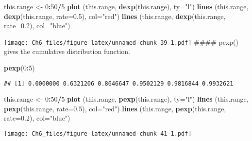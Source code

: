 \documentclass[
]{article}
\newenvironment{Shaded}{\begin{snugshade}}{\end{snugshade}}
\newcommand{\AttributeTok}[1]{\textcolor[rgb]{0.13,0.29,0.53}{#1}}
\newcommand{\DecValTok}[1]{\textcolor[rgb]{0.00,0.00,0.81}{#1}}
\newcommand{\FloatTok}[1]{\textcolor[rgb]{0.00,0.00,0.81}{#1}}
\newcommand{\FunctionTok}[1]{\textcolor[rgb]{0.13,0.29,0.53}{\textbf{#1}}}
\newcommand{\NormalTok}[1]{#1}
\newcommand{\OtherTok}[1]{\textcolor[rgb]{0.56,0.35,0.01}{#1}}
\newcommand{\SpecialCharTok}[1]{\textcolor[rgb]{0.81,0.36,0.00}{\textbf{#1}}}
\newcommand{\StringTok}[1]{\textcolor[rgb]{0.31,0.60,0.02}{#1}}
\begin{document}
\begin{Shaded}
\begin{Highlighting}[]
\NormalTok{this.range }\OtherTok{\textless{}{-}} \DecValTok{0}\SpecialCharTok{:}\DecValTok{50}\SpecialCharTok{/}\DecValTok{5}
\FunctionTok{plot}\NormalTok{ (this.range, }\FunctionTok{dexp}\NormalTok{(this.range), }\AttributeTok{ty=}\StringTok{"l"}\NormalTok{)}
\FunctionTok{lines}\NormalTok{ (this.range, }\FunctionTok{dexp}\NormalTok{(this.range, }\AttributeTok{rate=}\FloatTok{0.5}\NormalTok{), }\AttributeTok{col=}\StringTok{"red"}\NormalTok{)}
\FunctionTok{lines}\NormalTok{ (this.range, }\FunctionTok{dexp}\NormalTok{(this.range, }\AttributeTok{rate=}\FloatTok{0.2}\NormalTok{), }\AttributeTok{col=}\StringTok{"blue"}\NormalTok{)}
\end{Highlighting}
\end{Shaded}

\texttt{[image: Ch6\_files/figure-latex/unnamed-chunk-39-1.pdf]} \#\#\#\#
pexp() gives the cumulative distribution function.

\begin{Shaded}
\begin{Highlighting}[]
\FunctionTok{pexp}\NormalTok{(}\DecValTok{0}\SpecialCharTok{:}\DecValTok{5}\NormalTok{)}
\end{Highlighting}
\end{Shaded}

\begin{verbatim}
## [1] 0.0000000 0.6321206 0.8646647 0.9502129 0.9816844 0.9932621
\end{verbatim}

\begin{Shaded}
\begin{Highlighting}[]
\NormalTok{this.range }\OtherTok{\textless{}{-}} \DecValTok{0}\SpecialCharTok{:}\DecValTok{50}\SpecialCharTok{/}\DecValTok{5}
\FunctionTok{plot}\NormalTok{ (this.range, }\FunctionTok{pexp}\NormalTok{(this.range), }\AttributeTok{ty=}\StringTok{"l"}\NormalTok{)}
\FunctionTok{lines}\NormalTok{ (this.range, }\FunctionTok{pexp}\NormalTok{(this.range, }\AttributeTok{rate=}\FloatTok{0.5}\NormalTok{), }\AttributeTok{col=}\StringTok{"red"}\NormalTok{)}
\FunctionTok{lines}\NormalTok{ (this.range, }\FunctionTok{pexp}\NormalTok{(this.range, }\AttributeTok{rate=}\FloatTok{0.2}\NormalTok{), }\AttributeTok{col=}\StringTok{"blue"}\NormalTok{)}
\end{Highlighting}
\end{Shaded}

\texttt{[image: Ch6\_files/figure-latex/unnamed-chunk-41-1.pdf]}
\end{document}
